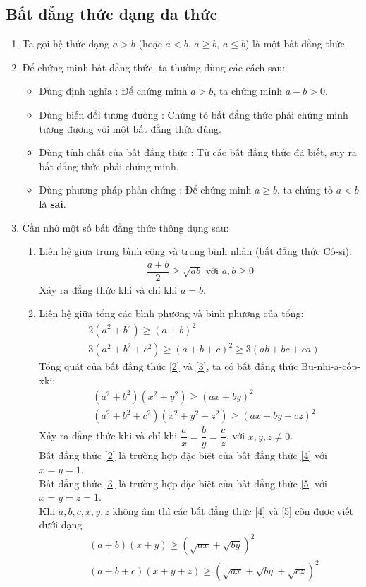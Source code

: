 \subsection{Bất đẳng thức dạng đa thức}
\begin{enumerate}[1.]
	\item Ta gọi hệ thức dạng $a>b$ (hoặc $a<b$, $a\geq b$, $a\leq b$) là một bất đẳng thức.
	\item Để chứng minh bất đẳng thức, ta thường dùng các cách sau:
	\begin{itemize}
		\item Dùng định nghĩa : Để chứng minh $a>b$, ta chứng minh $a-b>0$.
		\item Dùng biến đổi tương đường : Chứng tỏ bất đẳng thức phải chứng minh tương đương với một bất đẳng thức đúng.
		\item Dùng tính chất của bất đẳng thức : Từ các bất đẳng thức đã biết, suy ra bất đẳng thức phải chứng minh.
		\item Dùng phương pháp phản chứng : Để chứng minh $a\geq b$, ta chứng tỏ $a<b$ là \textbf{sai}.
	\end{itemize}
\item Cần nhớ một số bất đẳng thức thông dụng sau:
\begin{enumerate}
	\item Liên hệ giữa trung bình cộng và trung bình nhân (bất đẳng thức Cô-si):
	\begin{align}
	\dfrac{a+b}{2}\geq\sqrt{ab} \textrm{ với } a,b\geq0
	\end{align}
	Xảy ra đẳng thức khi và chỉ khi $a=b$.
	\item Liên hệ giữa tổng các bình phương và bình phương của tổng:
	\begin{align}
	&2(a^2+b^2)\geq(a+b)^2\label{2}\\
	&3(a^2+b^2+c^2)\geq(a+b+c)^2\geq3(ab+bc+ca)\label{3}
	\end{align}
	Tổng quát của bất đẳng thức \eqref{2} và \eqref{3}, ta có bất đẳng thức Bu-nhi-a-cốp-xki:
	\begin{align}
	&(a^2+b^2)(x^2+y^2)\geq(ax+by)^2\label{4}\\
	&(a^2+b^2+c^2)(x^2+y^2+z^2)\geq(ax+by+cz)^2\label{5}
	\end{align}
	Xảy ra đẳng thức khi và chỉ khi $\dfrac{a}{x}=\dfrac{b}{y}=\dfrac{c}{z}$, với $x,y,z\ne0$.\\
	Bất đẳng thức \eqref{2} là trường hợp đặc biệt của bất đẳng thức \eqref{4} với $x=y=1$.\\
	Bất đẳng thức \eqref{3} là trường hợp đặc biệt của bất đẳng thức \eqref{5} với $x=y=z=1$.\\
	Khi $a,b,c,x,y,z$ không âm thì các bất đẳng thức \eqref{4} và \eqref{5} còn được viết dưới dạng
	\begin{align*}
	&(a+b)(x+y)\geq\left(\sqrt{ax}+\sqrt{by}\right)^2\\
	&(a+b+c)(x+y+z)\geq\left(\sqrt{ax}+\sqrt{by}+\sqrt{cz}\right)^2
	\end{align*}
\end{enumerate}
\end{enumerate}
